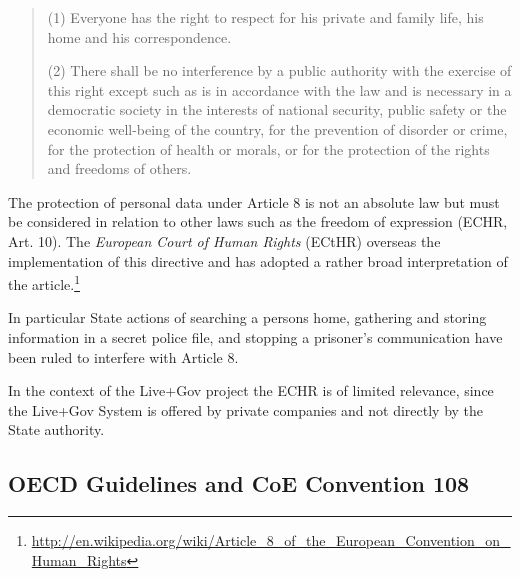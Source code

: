\begin{quote}
(1) Everyone has the right to respect for his private and family life, his home and his correspondence.

(2) There shall be no interference by a public authority with the exercise of this right except such as is in accordance with the law and is necessary in a democratic society in the interests of national security, public safety or the economic well-being of the country, for the prevention of disorder or crime, for the protection of health or morals, or for the protection of the rights and freedoms of others.
\end{quote}

The protection of personal data under Article 8 is not an absolute law but must be considered in relation to other laws such as the freedom of expression (ECHR, Art. 10).
The \emph{European Court of Human Rights} (ECtHR) overseas the implementation of this directive and has adopted a rather broad interpretation of the article.\footnote{\url{http://en.wikipedia.org/wiki/Article_8_of_the_European_Convention_on_Human_Rights}}

In particular State actions of searching a persons home, gathering and storing information in a secret police file, and stopping a prisoner's communication have been ruled to interfere with Article 8.

In the context of the Live+Gov project the ECHR is of limited relevance, since the Live+Gov System is offered by private companies and not directly by the State authority.

\subsection{OECD Guidelines and CoE Convention 108}

